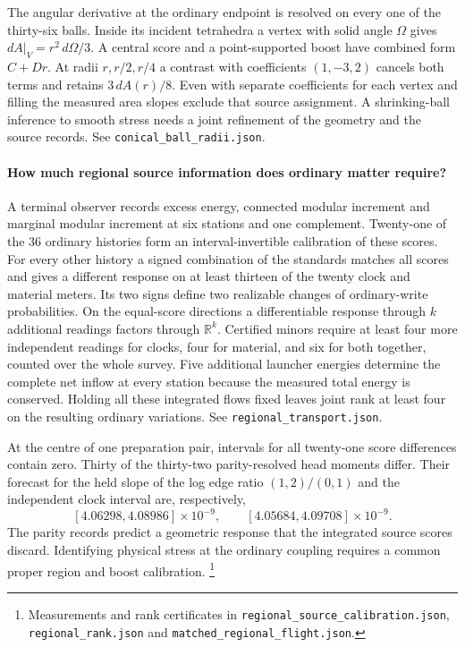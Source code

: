 \documentclass[11pt]{article}
\begin{document}
The angular derivative at the ordinary endpoint is resolved on every
one of the thirty-six balls. Inside its incident tetrahedra a vertex
with solid angle \(\Omega\) gives
\(dA|_V=r^2\,d\Omega/3\). A central score and a point-supported
boost have combined form \(C+Dr\). At radii \(r,r/2,r/4\) a contrast
with coefficients \((1,-3,2)\) cancels both terms and retains
\(3\,dA(r)/8\). Even with separate coefficients for each vertex and
filling the measured area slopes exclude that source assignment. A
shrinking-ball inference to smooth stress needs a joint refinement of
the geometry and the source records. See
\texttt{conical\_ball\_radii.json}.

\paragraph{How much regional source information does ordinary matter require?}
A terminal observer records excess energy, connected modular increment
and marginal modular increment at six stations and one complement.
Twenty-one of the 36 ordinary histories form an interval-invertible
calibration of these scores. For every other history a signed combination
of the standards matches all scores and gives a different response on
at least thirteen of the twenty clock and material meters. Its two
signs define two realizable changes of ordinary-write probabilities.
On the equal-score directions a differentiable response through \(k\)
additional readings factors through \(\mathbb R^k\). Certified minors
require at least four more independent readings for clocks, four for
material, and six for both together, counted over the whole survey.
Five additional launcher energies determine the complete net inflow
at every station because the measured total energy is conserved.
Holding all these integrated flows fixed leaves joint rank at
least four on the resulting ordinary variations. See
\texttt{regional\_transport.json}.

At the centre of one preparation pair, intervals for all twenty-one
score differences contain zero. Thirty of the thirty-two parity-resolved
head moments differ. Their forecast for the held slope of the log edge
ratio $(1,2)/(0,1)$ and the independent clock interval are, respectively,
\[
 [4.06298,4.08986]\times10^{-9},\qquad
 [4.05684,4.09708]\times10^{-9}.
\]
The parity records predict a geometric response that the integrated
source scores discard. Identifying physical stress at the ordinary
coupling requires a common proper region and boost calibration.%
\footnote{Measurements and rank certificates in
\nolinkurl{regional_source_calibration.json},
\nolinkurl{regional_rank.json} and
\nolinkurl{matched_regional_flight.json}.}
\end{document}
